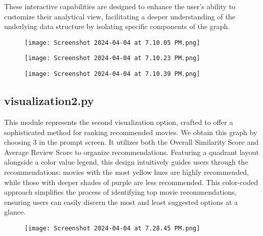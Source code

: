 \documentclass[fontsize=11pt]{article}
\begin{document}
These interactive capabilities are designed to enhance the user's ability to customize their analytical view, facilitating a deeper understanding of the underlying data structure by isolating specific components of the graph.

\begin{figure}[H] %
    \centering
    \texttt{[image: Screenshot 2024-04-04 at 7.10.05 PM.png]} %
    \label{fig:dir-structure} %
\end{figure}

\begin{figure}[H] %
    \centering
    \texttt{[image: Screenshot 2024-04-04 at 7.10.23 PM.png]} %
    \label{fig:dir-structure} %
\end{figure}

\begin{figure}[H] %
    \centering
    \texttt{[image: Screenshot 2024-04-04 at 7.10.39 PM.png]} %
    \label{fig:dir-structure} %
\end{figure}

\subsection*{visualization2.py}
This module represents the second visualization option, crafted to offer a sophisticated method for ranking recommended movies. We obtain this graph by choosing 3 in the prompt screen. It utilizes both the Overall Similarity Score and Average Review Score to organize recommendations. Featuring a quadrant layout alongside a color value legend, this design intuitively guides users through the recommendations: movies with the most yellow hues are highly recommended, while those with deeper shades of purple are less recommended. This color-coded approach simplifies the process of identifying top movie recommendations, ensuring users can easily discern the most and least suggested options at a glance.

\begin{figure}[H] %
    \centering
    \texttt{[image: Screenshot 2024-04-04 at 7.28.45 PM.png]} %
    \label{fig:dir-structure} %
\end{figure}
\end{document}
